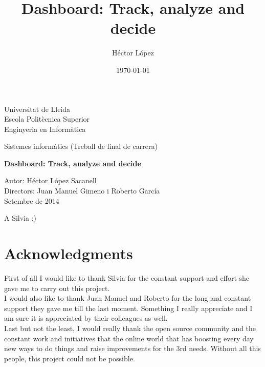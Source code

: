 \documentclass[a4paper,12pt,english]{book}
\newenvironment{dedication}
{
   \cleardoublepage
   \thispagestyle{empty}
   \vspace*{\stretch{1}}
   \hfill\begin{minipage}[t]{0.15\textwidth}
   \raggedright
}%
{
   \end{minipage}
   \vspace*{\stretch{3}}
   \clearpage
}
\begin{document}
\clearpage\thispagestyle{empty}
\vspace*{\fill}
\begin{framed}
	\begin{center}
	Universitat de Lleida \\ \medskip
	Escola Politècnica Superior \\ \medskip
	Enginyeria en Informàtica \\ \bigskip \bigskip
	
	Sistemes informàtics (Treball de final de carrera) \\ \bigskip \bigskip 
	
	\textbf{Dashboard: Track, analyze and decide}
	\end{center}

	\bigskip
	
	\raggedleft
	Autor: Héctor López Sacanell\\
	Directors: Juan Manuel Gimeno i Roberto García\\
	Setembre de 2014
	\bigskip
\end{framed}
\vfill
\clearpage

\title{Dashboard: Track, analyze and decide}
\author{Héctor López}

\date{\today}

\begin{dedication}
A Silvia :)
\end{dedication}

%

\tableofcontents

\newpage
\thispagestyle{empty}
 \chapter*{Acknowledgments}
First of all I would like to thank Silvia for the constant support and effort
she gave me to carry out this project.\\

I would also like to thank Juan Manuel and Roberto for the long
and constant support they gave me till the last moment. Something I really
appreciate and I am sure it is appreciated by their colleagues as well. \\

Last but not the least, I would really thank the open source community and the
constant work and initiatives that the online world that has boosting every day
new ways to do things and raise improvements for the 3rd needs. Without all this
people, this project could not be possible.
 
\end{document}
